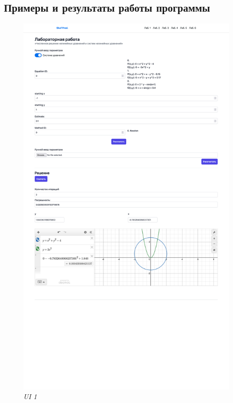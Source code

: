 \documentclass{article}
\begin{document}
      \subsection{Примеры и результаты работы программы}
            \begin{figure}[H] 
                  \begin{center}  
                        \includegraphics[scale=0.1]{SS1.png}
                        \caption{\small \sl UI 1}  
                  \end{center}  
            \end{figure}
\end{document}
